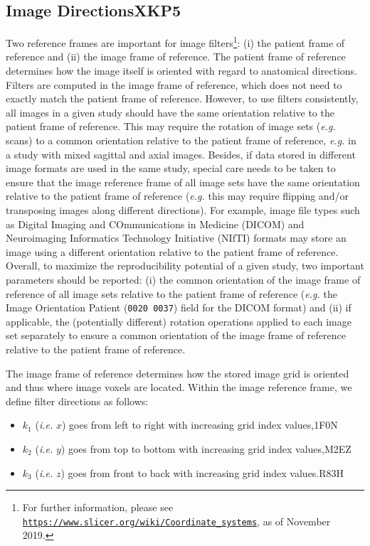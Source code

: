 \documentclass[fleqn,a4paper,oneside,openany]{book}
\newcommand\id[1]{{\hfill\normalsize{\idfont #1}}}
\newcommand\textid[1]{{\normalsize{\idfont #1}}}
\begin{document}
\subsection[Image Directions]{Image Directions\id{XKP5}}\label{sec:imageDirections} 
%
Two reference frames are important for image filters\footnote{For further information, please see \texttt{\url{https://www.slicer.org/wiki/Coordinate_systems}}, as of November 2019.}: (i) the patient frame of reference and (ii) the image frame of reference. The patient frame of reference determines how the image itself is oriented with regard to anatomical directions. Filters are computed in the image frame of reference, which does not need to exactly match the patient frame of reference. However, to use filters consistently, all images in a given study should have the same orientation relative to the patient frame of reference. This may require the rotation of image sets (\textit{e.g.} scans) to a common orientation relative to the patient frame of reference, \textit{e.g.} in a study with mixed sagittal and axial images. Besides, if data stored in different image formats are used in the same study, special care needs to be taken to ensure that the image reference frame of all image sets have the same orientation relative to the patient frame of reference (\textit{e.g.} this may require flipping and/or transposing images along different directions). For example, image file types such as Digital Imaging and COmmunications in Medicine (DICOM) and Neuroimaging Informatics Technology Initiative (NIfTI) formats may store an image using a different orientation relative to the patient frame of reference. Overall, to maximize the reproducibility potential of a given study, two important parameters should be reported: (i) the common orientation of the image frame of reference of all image sets relative to the patient frame of reference (\textit{e.g.} the Image Orientation Patient (\texttt{0020 0037}) field for the DICOM format) and (ii) if applicable, the (potentially different) rotation operations applied to each image set separately to ensure a common orientation of the image frame of reference relative to the patient frame of reference.  

The image frame of reference determines how the stored image grid is oriented and thus where image voxels are located. Within the image reference frame, we define filter directions as follows:
\begin{itemize}
    \item $k_1$ (\textit{i.e.} $x$) goes from left to right with increasing grid index values,\hfill \textid{1F0N}
    \item $k_2$ (\textit{i.e.} $y$) goes from top to bottom  with increasing grid index values,\hfill \textid{M2EZ}
    \item $k_3$ (\textit{i.e.} $z$) goes from front to back  with increasing grid index values.\hfill \textid{R83H}
\end{itemize}
\end{document}
